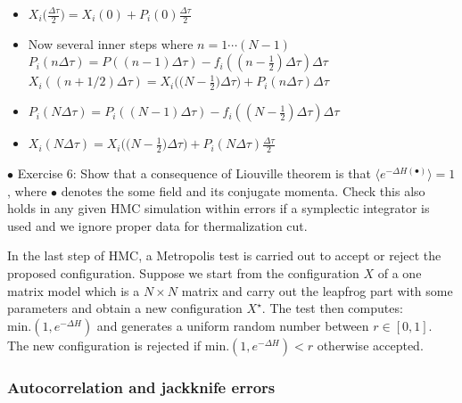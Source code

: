 \documentclass[11pt]{article}
\begin{document}
\begin{itemize}
	\item $X_{i}\big(\frac{\Delta \tau}{2}\big) = X_{i}(0) + P_{i}(0)\frac{\Delta \tau}{2}$
	\item Now several inner steps where $n =  1 \cdots (N-1)$
	\subitem $P_{i}(n \Delta \tau) = P((n-1) \Delta \tau) - f_{i}((n-\frac{1}{2}) \Delta \tau) \Delta \tau$ 
	\subitem $X_{i}((n + 1/2) \Delta \tau) = X_{i}\Big(\Big(N - \frac{1}{2}\Big) \Delta \tau\Big)  + P_{i}(n \Delta \tau) \Delta \tau$
	\item $P_{i}(N \Delta \tau) = P_{i}((N-1) \Delta \tau) - f_{i}((N-\frac{1}{2}) \Delta \tau) \Delta \tau$ 
	\item $X_{i}(N \Delta \tau) = X_{i}\Big(\Big(N - \frac{1}{2}\Big) \Delta \tau\Big) + P_{i}(N \Delta \tau) \frac{\Delta \tau}{2}$ 
	
\end{itemize} 


    \begin{mdframed}[backgroundcolor=blue!3] 
    \textsc{} 
    $\bullet$ Exercise 6: Show that a consequence of Liouville theorem is that $ \langle e^{-\Delta H(\bullet)} \rangle = 1$, where $\bullet$ denotes the some field and its conjugate momenta. Check this also holds in any given HMC simulation within errors if a symplectic integrator is used and we ignore proper data for thermalization cut.
    \end{mdframed} 
    

In the last step of HMC, a Metropolis test is carried out to accept or reject the proposed
configuration. Suppose we start from the configuration $X$ of a one matrix model 
which is a $N \times N$ matrix and carry out the leapfrog part with some parameters and obtain a new configuration 
$X^{\star}$. The test then computes: \texttt{$\text{min.}(1, e^{-\Delta H})$} and generates 
a uniform random number between $r \in [0,1]$. The new configuration is rejected if \texttt{$\text{min.}(1, e^{-\Delta H}) < r$} otherwise accepted. 



\subsubsection{Autocorrelation and jackknife errors} 
\end{document}
